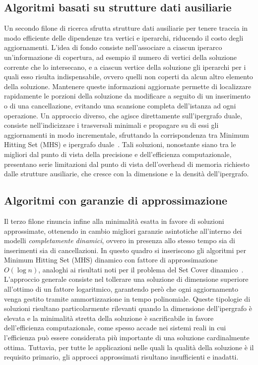 \subsection*{Algoritmi basati su strutture dati ausiliarie}

Un secondo filone di ricerca sfrutta strutture dati ausiliarie per tenere traccia in modo efficiente delle dipendenze tra vertici e iperarchi, riducendo il costo degli aggiornamenti.
L'idea di fondo consiste nell'associare a ciascun iperarco un'informazione di copertura, ad esempio il numero di vertici della soluzione corrente che lo intersecano, e a ciascun vertice della soluzione gli iperarchi per i quali esso risulta indispensabile, ovvero quelli non coperti da alcun altro elemento della soluzione.
Mantenere queste informazioni aggiornate permette di localizzare rapidamente le porzioni della soluzione da modificare a seguito di un inserimento o di una cancellazione, evitando una scansione completa dell'istanza ad ogni operazione.
Un approccio diverso, che agisce direttamente sull'ipergrafo duale, consiste nell'indicizzare i trasversali minimali e propagare su di essi gli aggiornamenti in modo incrementale, sfruttando la corrispondenza tra Minimum Hitting Set (MHS) e ipergrafo duale~\cite{murakami2011}.
Tali soluzioni, nonostante siano tra le migliori dal punto di vista della precisione e dell'efficienza computazionale, presentano serie limitazioni dal punto di vista dell'overhead di memoria richiesto dalle strutture ausiliarie, che cresce con la dimensione e la densità dell'ipergrafo.

\subsection*{Algoritmi con garanzie di approssimazione}

Il terzo filone rinuncia infine alla minimalità esatta in favore di soluzioni approssimate, ottenendo in cambio migliori garanzie asintotiche all'interno dei modelli \emph{completamente dinamici}, ovvero in presenza allo stesso tempo sia di inserimenti sia di cancellazioni.
In questo quadro si inseriscono gli algoritmi per Minimum Hitting Set (MHS) dinamico con fattore di approssimazione $O(\log n)$, analoghi ai risultati noti per il problema del Set Cover dinamico~\cite{agarwal2020}.
L'approccio generale consiste nel tollerare una soluzione di dimensione superiore all'ottimo di un fattore logaritmico, garantendo però che ogni aggiornamento venga gestito tramite ammortizzazione in tempo polinomiale.
Queste tipologie di soluzioni risultano particolarmente rilevanti quando la dimensione dell'ipergrafo è elevata e la minimalità stretta della soluzione è sacrificabile in favore dell'efficienza computazionale, come spesso accade nei sistemi reali in cui l'efficienza può essere considerata più importante di una soluzione cardinalmente ottima.
Tuttavia, per tutte le applicazioni nelle quali la qualità della soluzione è il requisito primario, gli approcci approssimati risultano insufficienti e inadatti.

